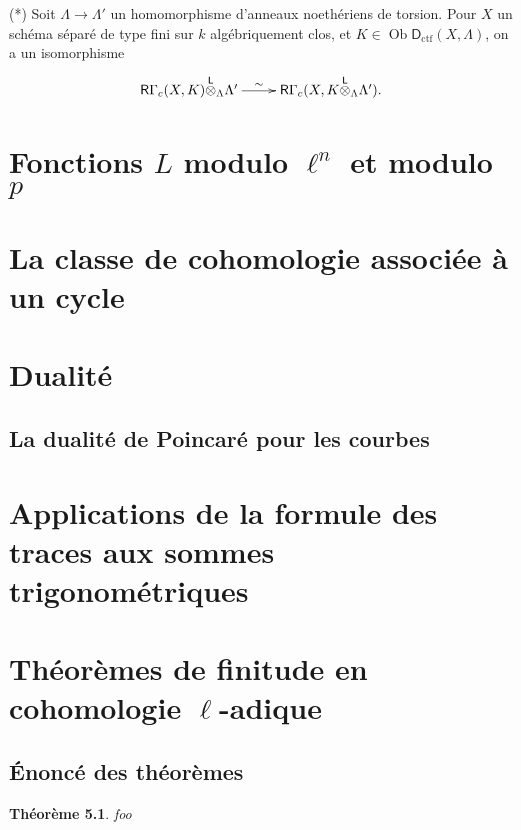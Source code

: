 \documentclass{book}
\DeclareMathOperator{\ob}{Ob}
\newcommand{\R}{\mathsf{R}}
\newcommand{\D}{\mathsf{D}}
\newcommand{\lotimes}{{\overset{\mathsf{L}}{\otimes}}}
\newtheorem{theorem_}[subsection]{Théorème}
\begin{document}
(*) Soit $\Lambda\to\Lambda'$ un homomorphisme d'anneaux noeth\'eriens de 
torsion. Pour $X$ un sch\'ema s\'epar\'e de type fini sur $k$ alg\'ebriquement 
clos, et $K\in\ob\D_\text{ctf}(X,\Lambda)$, on a un isomorphisme 
\[\xymatrix{
  \R\Gamma_c(X,K)\lotimes_\Lambda \Lambda' \ar[r]^-\sim & \R \Gamma_c(X,K\lotimes_\Lambda \Lambda') \text{.}
}\]










\chapter{Fonctions \texorpdfstring{$L$}{L} modulo \texorpdfstring{$\ell^n$}{l n} et modulo \texorpdfstring{$p$}{p}}\label{III}

\chapter{La classe de cohomologie associée à un cycle}\label{IV}

\chapter{Dualité}\label{V}

\section{La dualité de Poincaré pour les courbes}\label{V:2}

\chapter{Applications de la formule des traces aux sommes trigonométriques}\label{VI}

\chapter{Théorèmes de finitude en cohomologie \texorpdfstring{$\ell$}{l}-adique}\label{VII}

\section{Énoncé des théorèmes}\label{VII:1}

\begin{theorem_}\label{VII:1-1}
foo
\end{theorem_}
\end{document}
